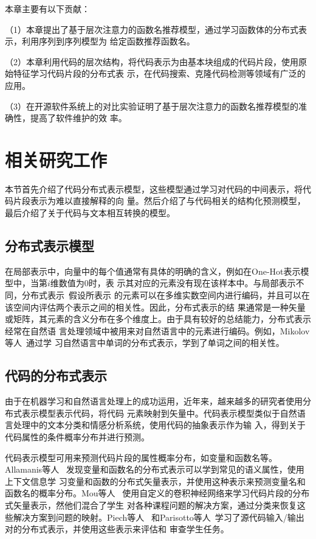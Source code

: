 本章主要有以下贡献：

（1）本章提出了基于层次注意力的函数名推荐模型，通过学习函数体的分布式表示，利用序列到序列模型为
给定函数推荐函数名。

（2）本章利用代码的层次结构，将代码表示为由基本块组成的代码片段，使用原始特征学习代码片段的分布式表
示，在代码搜索、克隆代码检测等领域有广泛的应用。

（3）在开源软件系统上的对比实验证明了基于层次注意力的函数名推荐模型的准确性，提高了软件维护的效
率。

\section{相关研究工作}
本节首先介绍了代码分布式表示模型，这些模型通过学习对代码的中间表示，将代码片段表示为难以直接解释的向
量。然后介绍了与代码相关的结构化预测模型，最后介绍了关于代码与文本相互转换的模型。

\subsection{分布式表示模型}
在局部表示中，向量中的每个值通常有具体的明确的含义，例如在One-Hot表示模型中，当第$i$维数值为0时，表
示其对应的元素没有现在该样本中。与局部表示不同，分布式表示~\cite{hinton1984distributed}假设所表示
的元素可以在多维实数空间内进行编码，并且可以在该空间内评估两个表示之间的相关性。因此，分布式表示的结
果通常是一种矢量或矩阵，其元素的含义分布在多个维度上。由于具有较好的总结能力，分布式表示经常在自然语
言处理领域中被用来对自然语言中的元素进行编码。例如，Mikolov等人~\cite{mikolov2013efficient}通过学
习自然语言中单词的分布式表示，学到了单词之间的相关性。

\subsection{代码的分布式表示}
由于在机器学习和自然语言处理上的成功运用，近年来，越来越多的研究者使用分布式表示模型表示代码，将代码
元素映射到矢量中。代码表示模型类似于自然语言处理中的文本分类和情感分析系统，使用代码的抽象表示作为输
入，得到关于代码属性的条件概率分布并进行预测。

代码表示模型可用来预测代码片段的属性概率分布，如变量和函数名等。Allamanis等人
~\cite{allamanis2015suggesting}发现变量和函数名的分布式表示可以学到常见的语义属性，使用上下文信息学
习变量和函数的分布式矢量表示，并使用这种表示来预测变量名和函数名的概率分布。Mou等人
~\cite{mou2016convolutional}使用自定义的卷积神经网络来学习代码片段的分布式矢量表示，然他们混合了学生
对各种课程问题的解决方案，通过分类来恢复这些解决方案到问题的映射。Piech等人~\cite{piech2015learning}
和Parisotto等人~\cite{parisotto2017neuro}学习了源代码输入/输出对的分布式表示，并使用这些表示来评估和
审查学生任务。

